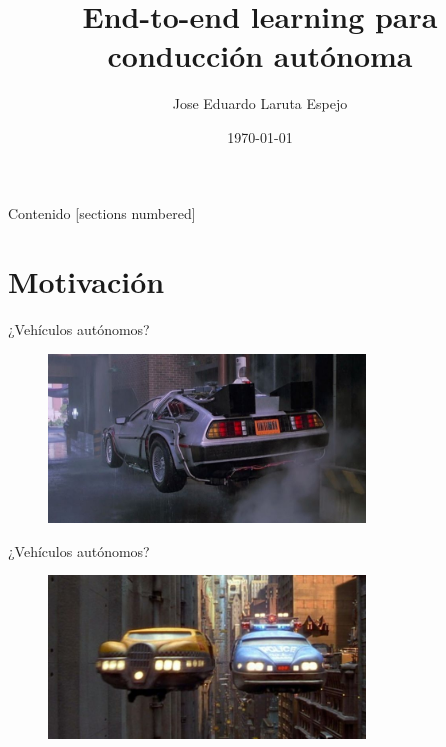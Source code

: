 \documentclass[10pt]{beamer}
\title{End-to-end learning para conducción autónoma}
\date{\today}
\author{Jose Eduardo Laruta Espejo}
\institute{PyDay La Paz - Universidad Católica Boliviana}
\begin{document}
\maketitle

\begin{frame}{Contenido}
  [sections numbered]
  \tableofcontents[hideallsubsections]
\end{frame}

\section{Motivación}

\begin{frame}[fragile]{¿Vehículos autónomos?}

\begin{figure}[!h] 
    \centering
    \includegraphics[width=0.75\textwidth]{../img/delorean}
\end{figure}

\end{frame}
\begin{frame}[fragile]{¿Vehículos autónomos?}

    \begin{figure}[!h] 
        \centering
        \includegraphics[width=0.75\textwidth]{../img/fifth}
    \end{figure}
    
\end{frame}
\end{document}
